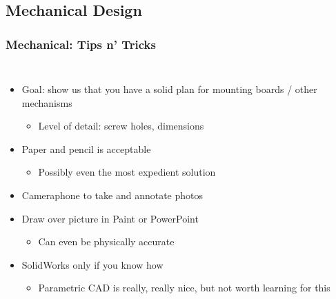 \documentclass{beamer}
\begin{document}
\subsection{Mechanical Design}

\begin{frame}
\frametitle{Mechanical: Tips n' Tricks}
\begin{columns}[t]
\begin{itemize}
  \item Goal: show us that you have a solid plan for mounting boards / other mechanisms
  \begin{itemize}
    \item Level of detail: screw holes, dimensions
  \end{itemize}
  \item Paper and pencil is acceptable
  \begin{itemize}
    \item Possibly even the most expedient solution
  \end{itemize}
  \item Cameraphone to take and annotate photos
  \item Draw over picture in Paint or PowerPoint
  \begin{itemize}
    \item Can even be physically accurate
  \end{itemize}
  \item SolidWorks only if you know how
  \begin{itemize}
    \item Parametric CAD is really, really nice, but not worth learning for this
  \end{itemize}
\end{itemize}


\end{columns}
\end{frame}
\end{document}

